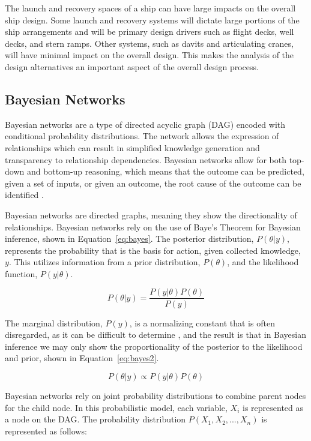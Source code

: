 \documentclass{svproc}
\begin{document}
The launch and recovery spaces of a ship can have large impacts on the overall ship design. Some launch and recovery systems will dictate large portions of the ship arrangements and will be primary design drivers such as flight decks, well decks, and stern ramps. Other systems, such as davits and articulating cranes, will have minimal impact on the overall design. This makes the analysis of the design alternatives an important aspect of the overall design process.

\subsection{Bayesian Networks}

Bayesian networks are a type of directed acyclic graph (DAG) encoded with conditional probability distributions. The network allows the expression of relationships which can result in simplified knowledge generation and transparency to relationship dependencies. Bayesian networks allow for both top-down and bottom-up reasoning, which means that the outcome can be predicted, given a set of inputs, or given an outcome, the root cause of the outcome can be identified \cite{murphy_brief_1998}. 

Bayesian networks are directed graphs, meaning they show the directionality of relationships. Bayesian networks rely on the use of Baye's Theorem for Bayesian inference, shown in Equation~\ref{eq:bayes}. The posterior distribution, $P(\theta|y)$, represents the probability that is the basis for action, given collected knowledge, $y$. This utilizes information from a prior distribution, $P(\theta)$, and the likelihood function, $P(y|\theta)$. 

\begin{equation}
    P(\theta|y) = \frac{P(y|\theta)P(\theta)}{P(y)}
    \label{eq:bayes}
\end{equation}

The marginal distribution, $P(y)$, is a normalizing constant that is often disregarded, as it can be difficult to determine \cite{gelman_bayesian_2013}, and the result is that in Bayesian inference we may only show the proportionality of the posterior to the likelihood and prior, shown in Equation~\ref{eq:bayes2}. 

\begin{equation}
    P(\theta|y) \propto {P(y|\theta)P(\theta)}
    \label{eq:bayes2}
\end{equation}

Bayesian networks rely on joint probability distributions to combine parent nodes for the child node. In this probabilistic model, each variable, $X_i$ is represented as a node on the DAG. The probability distribution $P(X_1,X_2,...,X_n)$ is represented as follows:
\end{document}
